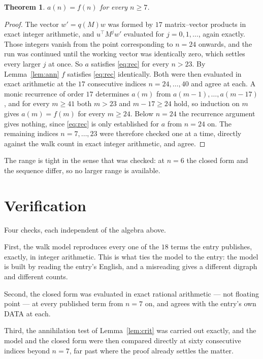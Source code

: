 \documentclass[11pt,a4paper]{article}
\theoremstyle{plain}
\newtheorem{theorem}{Theorem}
\theoremstyle{definition}
\begin{document}
\begin{theorem}
$a(n)=f(n)$ for every $n\ge7$.
\end{theorem}

\begin{proof}
The vector $w'=q(M)w$ was formed by $17$ matrix--vector products in exact integer
arithmetic, and $u^{\!\top}M^{j}w'$ evaluated for $j=0,1,\dots$, again exactly. Those integers
vanish from the point corresponding to $n=24$ onwards, and the run was continued until the
working vector was identically zero, which settles every larger $j$ at once. So $a$ satisfies
\eqref{eq:rec} for every $n>23$. By Lemma~\ref{lem:ann} $f$ satisfies \eqref{eq:rec}
identically. Both were then evaluated in exact arithmetic at the $17$ consecutive indices
$n=24,\dots,40$ and agree at each. A monic recurrence of order $17$
determines $a(m)$ from $a(m-1),\dots,a(m-17)$, and for every $m\ge41$ both
$m>23$ and $m-17\ge24$ hold, so induction on $m$ gives $a(m)=f(m)$ for every
$m\ge24$.
Below $n=24$ the recurrence argument gives nothing, since \eqref{eq:rec} is only
established for $a$ from $n=24$ on. The remaining indices $n=7,\dots,23$ were
therefore checked one at a time, directly against the walk count in exact integer arithmetic,
and agree.
\end{proof}

The range is tight in the sense that was checked: at $n=6$ the closed form and the sequence differ, so no larger range is available.

\section{Verification}

Four checks, each independent of the algebra above.

First, the walk model reproduces every one of the $18$ terms the entry publishes,
exactly, in integer arithmetic. This is what ties the model to the entry: the model is built
by reading the entry's English, and a misreading gives a different digraph and different
counts.

Second, the closed form was evaluated in exact rational arithmetic --- not floating point ---
at every published term from $n=7$ on, and agrees with the entry's own DATA at each.

Third, the annihilation test of Lemma~\ref{lem:crit} was carried out exactly, and the model
and the closed form were then compared directly at sixty consecutive indices beyond
$n=7$, far past where the proof already settles the matter.
\end{document}

